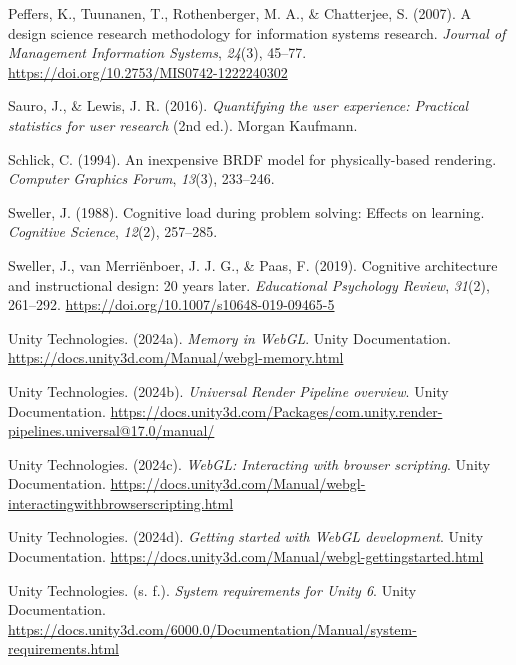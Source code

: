 \begin{list}{}
\item Peffers, K., Tuunanen, T., Rothenberger, M. A., \& Chatterjee, S. (2007). A design science research methodology for information systems research. \textit{Journal of Management Information Systems}, \textit{24}(3), 45--77. \url{https://doi.org/10.2753/MIS0742-1222240302}

\item Sauro, J., \& Lewis, J. R. (2016). \textit{Quantifying the user experience: Practical statistics for user research} (2nd ed.). Morgan Kaufmann.

\item Schlick, C. (1994). An inexpensive BRDF model for physically-based rendering. \textit{Computer Graphics Forum}, \textit{13}(3), 233--246.

\item Sweller, J. (1988). Cognitive load during problem solving: Effects on learning. \textit{Cognitive Science}, \textit{12}(2), 257--285.

\item Sweller, J., van Merri\"enboer, J. J. G., \& Paas, F. (2019). Cognitive architecture and instructional design: 20 years later. \textit{Educational Psychology Review}, \textit{31}(2), 261--292. \url{https://doi.org/10.1007/s10648-019-09465-5}

\item Unity Technologies. (2024a). \textit{Memory in WebGL}. Unity Documentation. \url{https://docs.unity3d.com/Manual/webgl-memory.html}

\item Unity Technologies. (2024b). \textit{Universal Render Pipeline overview}. Unity Documentation. \url{https://docs.unity3d.com/Packages/com.unity.render-pipelines.universal@17.0/manual/}

\item Unity Technologies. (2024c). \textit{WebGL: Interacting with browser scripting}. Unity Documentation. \url{https://docs.unity3d.com/Manual/webgl-interactingwithbrowserscripting.html}

\item Unity Technologies. (2024d). \textit{Getting started with WebGL development}. Unity Documentation. \url{https://docs.unity3d.com/Manual/webgl-gettingstarted.html}

\item Unity Technologies. (s. f.). \textit{System requirements for Unity 6}. Unity Documentation. \url{https://docs.unity3d.com/6000.0/Documentation/Manual/system-requirements.html}


\end{list}
